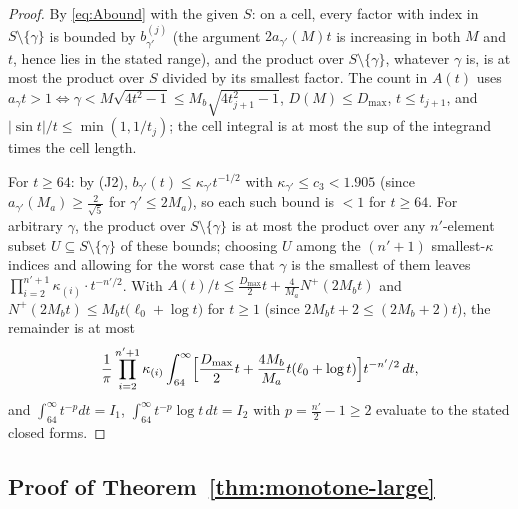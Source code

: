 \documentclass[11pt]{article}
\begin{document}
\begin{proof}
By \eqref{eq:Abound} with the given $S$: on a cell, every factor with
index in $S\setminus\{\gamma\}$ is bounded by $b^{(j)}_{\gamma'}$
(the argument $2a_{\gamma'}(M)t$ is increasing in both $M$ and $t$,
hence lies in the stated range), and the product over
$S\setminus\{\gamma\}$, whatever $\gamma$ is, is at most the product
over $S$ divided by its smallest factor. The count in $A(t)$ uses
$a_\gamma t>1\iff\gamma<M\sqrt{4t^2-1}\le M_b\sqrt{4t_{j+1}^2-1}$,
$D(M)\le D_{\max}$, $t\le t_{j+1}$, and $|\sin t|/t\le\min(1,1/t_j)$;
the cell integral is at most the sup of the integrand times the cell
length.

For $t\ge64$: by (J2), $b_{\gamma'}(t)\le\kappa_{\gamma'}t^{-1/2}$
with $\kappa_{\gamma'}\le c_3<1.905$ (since
$a_{\gamma'}(M_a)\ge\tfrac2{\sqrt5}$ for $\gamma'\le2M_a$), so each
such bound is $<1$ for $t\ge64$. For arbitrary $\gamma$, the product
over $S\setminus\{\gamma\}$ is at most the product over any
$n'$-element subset $U\subseteq S\setminus\{\gamma\}$ of these
bounds; choosing $U$ among the $(n'+1)$ smallest-$\kappa$ indices and
allowing for the worst case that $\gamma$ is the smallest of them
leaves $\prod_{i=2}^{n'+1}\kappa_{(i)}\cdot t^{-n'/2}$. With
$A(t)/t\le\tfrac{D_{\max}}2t+\tfrac4{M_a}N^+(2M_bt)$ and
$N^+(2M_bt)\le M_bt\bigl(\ell_0+\log t\bigr)$ for $t\ge1$ (since
$2M_bt+2\le(2M_b+2)t$), the remainder is at most
\[
\frac1\pi\prod_{i=2}^{n'+1}\kappa_{(i)}
\int_{64}^\infty\Bigl[\frac{D_{\max}}2t
+\frac{4M_b}{M_a}t(\ell_0+\log t)\Bigr]t^{-n'/2}\,dt ,
\]
and $\int_{64}^\infty t^{-p}dt=I_1$,
$\int_{64}^\infty t^{-p}\log t\,dt=I_2$ with $p=\tfrac{n'}2-1\ge2$
evaluate to the stated closed forms.
\end{proof}

\subsection*{Proof of Theorem~\ref{thm:monotone-large}}
\end{document}
